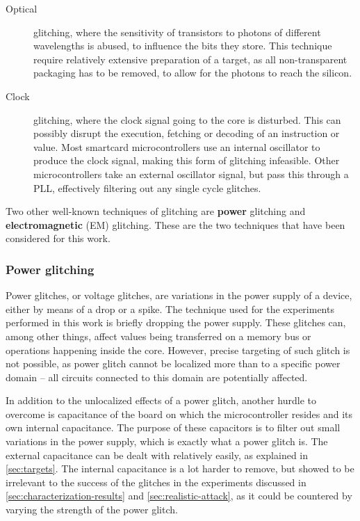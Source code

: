 \documentclass[10pt]{article}
\begin{document}
    \begin{description}
      \item[Optical] glitching, where the sensitivity of transistors to photons of different wavelengths is abused, to influence the bits they store. This technique require relatively extensive preparation of a target, as all non-transparent packaging has to be removed, to allow for the photons to reach the silicon. \cite{skorobogatov_optical_2002,van_woudenberg_practical_2011}
      \item[Clock] glitching, where the clock signal going to the core is disturbed. This can possibly disrupt the execution, fetching or decoding of an instruction or value. Most smartcard microcontrollers use an internal oscillator to produce the clock signal, making this form of glitching infeasible. Other microcontrollers take an external oscillator signal, but pass this through a PLL, effectively filtering out any single cycle glitches. 
      \cite{balasch_-depth_2011}
    \end{description}

    \noindent Two other well-known techniques of glitching are \textbf{power} glitching and \textbf{electromagnetic} (EM) glitching. These are the two techniques that have been considered for this work.

    \subsubsection{Power glitching }

      Power glitches, or voltage glitches, are variations in the power supply of a device, either by means of a drop or a spike. 
      The technique used for the experiments performed in this work is briefly dropping the power supply. These glitches can, among other things, affect values being transferred on a memory bus or operations happening inside the core. However, precise targeting of such glitch is not possible, as power glitch cannot be localized more than to a specific power domain -- all circuits connected to this domain are potentially affected. 

      In addition to the unlocalized effects of a power glitch, another hurdle to overcome is capacitance of the board on which the microcontroller resides and its own internal capacitance. The purpose of these capacitors is to filter out small variations in the power supply, which is exactly what a power glitch is.
      The external capacitance can be dealt with relatively easily, as explained in \autoref{sec:targets}. The internal capacitance is a lot harder to remove, but showed to be irrelevant to the success of the glitches in the experiments discussed in \autoref{sec:characterization-results} and \autoref{sec:realistic-attack}, as it could be countered by varying the strength of the power glitch.
\end{document}
